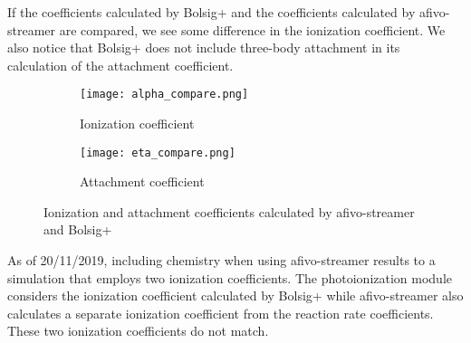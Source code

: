 \documentclass[a4paper, 12pt]{article}
\begin{document}
	If the coefficients calculated by Bolsig+ and the coefficients calculated by afivo-streamer are compared, we see some difference in the ionization coefficient. We also notice that Bolsig+ does not include three-body attachment in its calculation of the attachment coefficient.
	
    \begin{figure}[H]
		\centering
		\begin{subfigure}[H]{0.4\textwidth}
			\texttt{[image: alpha\_compare.png]}
			\caption{Ionization coefficient}
		\end{subfigure}
		\begin{subfigure}[H]{0.4\textwidth}
			\texttt{[image: eta\_compare.png]}
			\caption{Attachment coefficient}
		\end{subfigure}
		\caption{Ionization and attachment coefficients calculated by afivo-streamer and Bolsig+}
	\end{figure}
	
	As of 20/11/2019, including chemistry when using afivo-streamer results to a simulation that employs two ionization coefficients. The photoionization module considers the ionization coefficient calculated by Bolsig+ while afivo-streamer also calculates a separate ionization coefficient from the reaction rate coefficients. These two ionization coefficients do not match.
\end{document}
